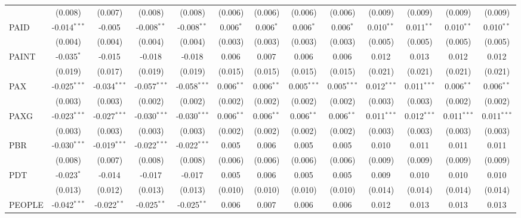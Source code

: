 \begin{table}[!htbp]
\begin{tabular}{@{\extracolsep{5pt}}lcccccccccccc}
  & (0.008) & (0.007) & (0.008) & (0.008) & (0.006) & (0.006) & (0.006) & (0.006) & (0.009) & (0.009) & (0.009) & (0.009) \\
 PAID & -0.014$^{***}$ & -0.005$^{}$ & -0.008$^{**}$ & -0.008$^{**}$ & 0.006$^{*}$ & 0.006$^{*}$ & 0.006$^{*}$ & 0.006$^{*}$ & 0.010$^{**}$ & 0.011$^{**}$ & 0.010$^{**}$ & 0.010$^{**}$ \\
  & (0.004) & (0.004) & (0.004) & (0.004) & (0.003) & (0.003) & (0.003) & (0.003) & (0.005) & (0.005) & (0.005) & (0.005) \\
 PAINT & -0.035$^{*}$ & -0.015$^{}$ & -0.018$^{}$ & -0.018$^{}$ & 0.006$^{}$ & 0.007$^{}$ & 0.006$^{}$ & 0.006$^{}$ & 0.012$^{}$ & 0.013$^{}$ & 0.012$^{}$ & 0.012$^{}$ \\
  & (0.019) & (0.017) & (0.019) & (0.019) & (0.015) & (0.015) & (0.015) & (0.015) & (0.021) & (0.021) & (0.021) & (0.021) \\
 PAX & -0.025$^{***}$ & -0.034$^{***}$ & -0.057$^{***}$ & -0.058$^{***}$ & 0.006$^{**}$ & 0.006$^{**}$ & 0.005$^{***}$ & 0.005$^{***}$ & 0.012$^{***}$ & 0.011$^{***}$ & 0.006$^{**}$ & 0.006$^{**}$ \\
  & (0.003) & (0.003) & (0.002) & (0.002) & (0.002) & (0.002) & (0.002) & (0.002) & (0.003) & (0.003) & (0.002) & (0.002) \\
 PAXG & -0.023$^{***}$ & -0.027$^{***}$ & -0.030$^{***}$ & -0.030$^{***}$ & 0.006$^{**}$ & 0.006$^{**}$ & 0.006$^{**}$ & 0.006$^{**}$ & 0.011$^{***}$ & 0.012$^{***}$ & 0.011$^{***}$ & 0.011$^{***}$ \\
  & (0.003) & (0.003) & (0.003) & (0.003) & (0.002) & (0.002) & (0.002) & (0.002) & (0.003) & (0.003) & (0.003) & (0.003) \\
 PBR & -0.030$^{***}$ & -0.019$^{***}$ & -0.022$^{***}$ & -0.022$^{***}$ & 0.005$^{}$ & 0.006$^{}$ & 0.005$^{}$ & 0.005$^{}$ & 0.010$^{}$ & 0.011$^{}$ & 0.011$^{}$ & 0.011$^{}$ \\
  & (0.008) & (0.007) & (0.008) & (0.008) & (0.006) & (0.006) & (0.006) & (0.006) & (0.009) & (0.009) & (0.009) & (0.009) \\
 PDT & -0.023$^{*}$ & -0.014$^{}$ & -0.017$^{}$ & -0.017$^{}$ & 0.005$^{}$ & 0.006$^{}$ & 0.005$^{}$ & 0.005$^{}$ & 0.009$^{}$ & 0.010$^{}$ & 0.010$^{}$ & 0.010$^{}$ \\
  & (0.013) & (0.012) & (0.013) & (0.013) & (0.010) & (0.010) & (0.010) & (0.010) & (0.014) & (0.014) & (0.014) & (0.014) \\
 PEOPLE & -0.042$^{***}$ & -0.022$^{**}$ & -0.025$^{**}$ & -0.025$^{**}$ & 0.006$^{}$ & 0.007$^{}$ & 0.006$^{}$ & 0.006$^{}$ & 0.012$^{}$ & 0.013$^{}$ & 0.013$^{}$ & 0.013$^{}$ \\

\end{tabular}
\end{table}
